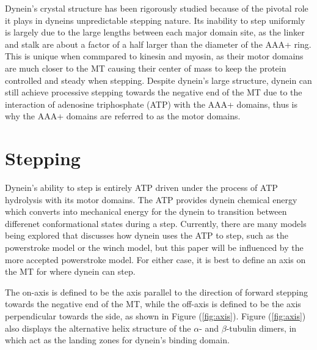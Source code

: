 Dynein's crystal structure has been rigorously studied because of the pivotal role it plays in dyneins unpredictable stepping nature. Its inability to step uniformly is largely due to the large lengths between each major domain site, as the linker and stalk are about a factor of a half larger than the diameter of the AAA+ ring. This is unique when commpared to kinesin and myosin, as their motor domains are much closer to the MT causing their center of mass to keep the protein controlled and steady when stepping. Despite dynein's large structure, dynein can still achieve processive stepping towards the negative end of the MT due to the interaction of adenosine triphosphate (ATP) with the AAA+ domains, thus is why the AAA+ domains are referred to as the motor domains.





\section{Stepping}

Dynein's ability to step is entirely ATP driven under the process of ATP hydrolysis with its motor domains. The ATP provides dynein chemical energy which converts into mechanical energy for the dynein to transition between differenet conformational states during a step. Currently, there are many models being explored that discusses how dynein uses the ATP to step, such as the powerstroke model or the winch model, but this paper will be influenced by the more accepted powerstroke model. For either case, it is best to define an axis on the MT for where dynein can step. 

The on-axis is defined to be the axis parallel to the direction of forward stepping towards the negative end of the MT, while the off-axis is defined to be the axis perpendicular towards the side, as shown in Figure (\ref{fig:axis}). Figure (\ref{fig:axis}) also displays the alternative helix structure of the $\alpha$- and $\beta$-tubulin dimers, in which act as the landing zones for dynein's binding domain.  

